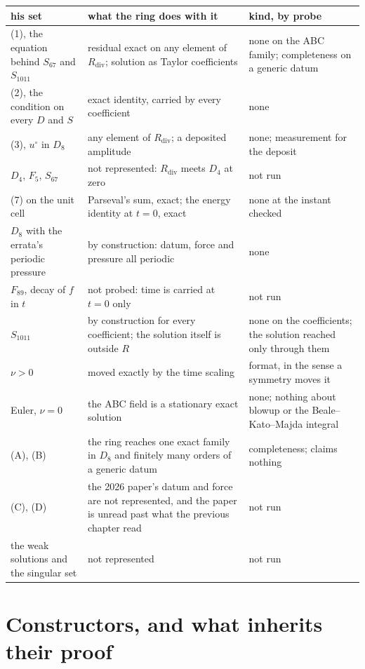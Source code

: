 \begin{center}
\begin{tabular}{@{}p{}p{}p{}@{}}
\toprule
his set & what the ring does with it & kind, by probe \\
\midrule
(1), the equation behind $S_{67}$ and $S_{1011}$ & residual exact on any element of $R_{\mathrm{div}}$; solution as Taylor coefficients & none on the ABC family; completeness on a generic datum \\[0.4em]
(2), the condition on every $D$ and $S$ & exact identity, carried by every coefficient & none \\[0.4em]
(3), $u^\circ$ in $D_8$ & any element of $R_{\mathrm{div}}$; a deposited amplitude & none; measurement for the deposit \\[0.4em]
$D_4$, $F_5$, $S_{67}$ & not represented: $R_{\mathrm{div}}$ meets $D_4$ at zero & not run \\[0.4em]
(7) on the unit cell & Parseval's sum, exact; the energy identity at $t=0$, exact & none at the instant checked \\[0.4em]
$D_8$ with the errata's periodic pressure & by construction: datum, force and pressure all periodic & none \\[0.4em]
$F_{89}$, decay of $f$ in $t$ & not probed: time is carried at $t=0$ only & not run \\[0.4em]
$S_{1011}$ & by construction for every coefficient; the solution itself is outside $R$ & none on the coefficients; the solution reached only through them \\[0.4em]
$\nu > 0$ & moved exactly by the time scaling & format, in the sense a symmetry moves it \\[0.4em]
Euler, $\nu = 0$ & the ABC field is a stationary exact solution & none; nothing about blowup or the Beale--Kato--Majda integral \\[0.4em]
(A), (B) & the ring reaches one exact family in $D_8$ and finitely many orders of a generic datum & completeness; claims nothing \\[0.4em]
(C), (D) & the 2026 paper's datum and force are not represented, and the paper is unread past what the previous chapter read & not run \\[0.4em]
the weak solutions and the singular set & not represented & not run \\
\bottomrule
\end{tabular}
\end{center}

\section{Constructors, and what inherits their proof}

